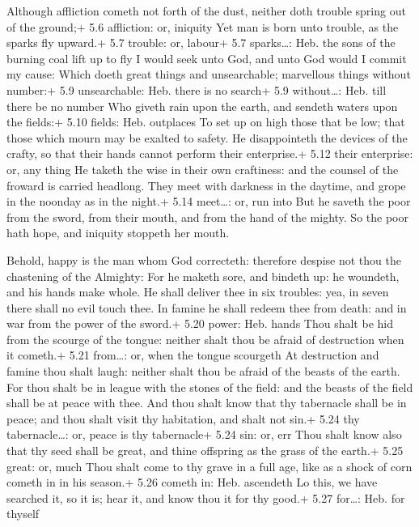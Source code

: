  Although affliction cometh not forth of the dust, neither
doth trouble spring out of the ground;+ 5.6 affliction: or, iniquity
 Yet man is born unto trouble, as the sparks fly upward.+
5.7 trouble: or, labour+ 5.7 sparks\ldots: Heb. the sons of the burning
coal lift up to fly  I would seek unto God, and unto God
would I commit my cause:  Which doeth great things and
unsearchable; marvellous things without number:+ 5.9 unsearchable: Heb.
there is no search+ 5.9 without\ldots: Heb. till there be no number
 Who giveth rain upon the earth, and sendeth waters upon
the fields:+ 5.10 fields: Heb. outplaces  To set up on high
those that be low; that those which mourn may be exalted to safety.
 He disappointeth the devices of the crafty, so that their
hands cannot perform their enterprise.+ 5.12 their enterprise: or, any
thing  He taketh the wise in their own craftiness: and the
counsel of the froward is carried headlong.  They meet with
darkness in the daytime, and grope in the noonday as in the night.+ 5.14
meet\ldots: or, run into  But he saveth the poor from the
sword, from their mouth, and from the hand of the mighty. 
So the poor hath hope, and iniquity stoppeth her mouth.

 Behold, happy is the man whom God correcteth: therefore
despise not thou the chastening of the Almighty:  For he
maketh sore, and bindeth up: he woundeth, and his hands make whole.
 He shall deliver thee in six troubles: yea, in seven there
shall no evil touch thee.  In famine he shall redeem thee
from death: and in war from the power of the sword.+ 5.20 power: Heb.
hands  Thou shalt be hid from the scourge of the tongue:
neither shalt thou be afraid of destruction when it cometh.+ 5.21
from\ldots: or, when the tongue scourgeth  At destruction
and famine thou shalt laugh: neither shalt thou be afraid of the beasts
of the earth.  For thou shalt be in league with the stones
of the field: and the beasts of the field shall be at peace with thee.
 And thou shalt know that thy tabernacle shall be in peace;
and thou shalt visit thy habitation, and shalt not sin.+ 5.24 thy
tabernacle\ldots: or, peace is thy tabernacle+ 5.24 sin: or, err
 Thou shalt know also that thy seed shall be great, and
thine offspring as the grass of the earth.+ 5.25 great: or, much
 Thou shalt come to thy grave in a full age, like as a
shock of corn cometh in in his season.+ 5.26 cometh in: Heb. ascendeth
 Lo this, we have searched it, so it is; hear it, and know
thou it for thy good.+ 5.27 for\ldots: Heb. for thyself

